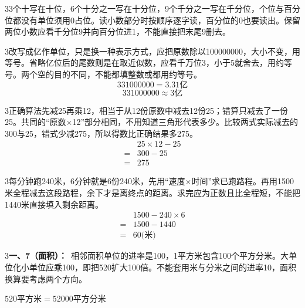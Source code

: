\documentclass[multi=snippet,border={5bp 20bp 5bp 5bp}]{standalone}
\newenvironment{snippet}[3]{\begin{minipage}{#1bp}\color{answerred}\fontsize{#2}{#3}\selectfont\raggedright}{\end{minipage}}
\begin{document}
\begin{snippet}{505}{11.5}{14}\begin{multicols}{3}\raggedcolumns 3个十写在十位，6个十分之一写在十分位，9个千分之一写在千分位，个位与百分位都没有单位须用0占位。读小数部分时按顺序逐字读，百分位的0也要读出。保留两位小数应看千分位9并向百分位进1，不能直接把末尾9删去。\end{multicols}\end{snippet}
\begin{snippet}{505}{11.5}{14}\begin{multicols}{3}\raggedcolumns 改写成亿作单位，只是换一种表示方式，应把原数除以100000000，大小不变，用等号。省略亿位后的尾数则是在取近似数，应看千万位3，小于5就舍去，用约等号。两个空的目的不同，不能都填整数或都用约等号。\[331000000=3.31\text{亿}\]\[331000000\approx3\text{亿}\]\end{multicols}\end{snippet}
\begin{snippet}{505}{11.5}{14}\begin{multicols}{3}\raggedcolumns 正确算法先减25再乘12，相当于从12份原数中减去12份25；错算只减去了一份25。共同的“原数×12”部分相同，不用知道三角形代表多少。比较两式实际减去的300与25，错式少减275，所以得数比正确结果多275。\[\begin{aligned}&25\times12-25\\={}&300-25\\={}&275\end{aligned}\]\end{multicols}\end{snippet}
\begin{snippet}{505}{11.5}{14}\begin{multicols}{3}\raggedcolumns 每分钟跑240米，6分钟就是6份240米，先用“速度×时间”求已跑路程。再用1500米全程减去这段路程，余下才是离终点的距离。求完应为正数且比全程短，不能把1440米直接填入剩余距离。\[\begin{aligned}&1500-240\times6\\={}&1500-1440\\={}&60\text{(米)}\end{aligned}\]\end{multicols}\end{snippet}
\begin{snippet}{505}{11.5}{14}\begin{multicols}{3}\raggedcolumns \textbf{一、7（面积）：}\ 相邻面积单位的进率是100，1平方米包含100个平方分米。大单位化小单位应乘100，即把520扩大100倍。不能套用米与分米之间的进率10，面积换算要考虑两个方向。\par\noindent\(\displaystyle 520\text{平方米}=52000\text{平方分米}\)\allowbreak \par\end{multicols}\end{snippet}
\end{document}
